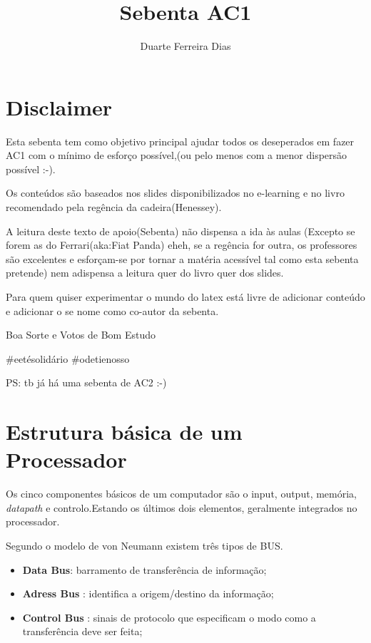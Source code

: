 \documentclass[10pt,a4paper]{book}
\author{Duarte Ferreira Dias }
\title{Sebenta AC1}
\begin{document}
\maketitle
\tableofcontents{}
\chapter{Disclaimer}

	Esta sebenta tem como objetivo principal ajudar todos os deseperados em fazer AC1 com o mínimo de esforço possível,(ou pelo menos com a menor dispersão possível :-).

	Os conteúdos são baseados nos slides disponibilizados no e-learning e no livro recomendado pela regência da cadeira(Henessey).

	A leitura deste texto de apoio(Sebenta) não dispensa a ida às aulas (Excepto se forem as do Ferrari(aka:Fiat Panda) eheh, se a regência for outra, os professores são excelentes e esforçam-se por tornar a matéria acessível tal como esta sebenta pretende) nem adispensa a leitura quer do livro quer dos slides.

	Para quem quiser experimentar o mundo do latex está livre de adicionar conteúdo e adicionar o se nome como co-autor da sebenta.

	Boa Sorte e Votos de Bom Estudo

	#eetésolidário #odetienosso

	PS: tb já há uma sebenta de AC2 :-)


\chapter{Estrutura básica de um Processador}

	Os cinco componentes básicos de um computador são o input, output, memória, \textit{datapath} e controlo.Estando os últimos dois elementos, geralmente integrados no processador.

	Segundo o modelo de von Neumann existem três tipos de BUS.
		\begin{itemize}
			\item \textbf{Data Bus}: barramento de transferência de informação;
			\item \textbf{Adress Bus} : identifica a origem/destino da informação;
			\item \textbf{Control Bus} : sinais de protocolo que especificam o modo como a transferência deve ser feita;
		\end{itemize}
\end{document}
